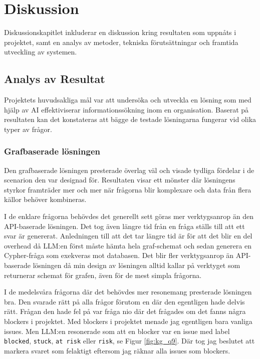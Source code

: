 \section{Diskussion}\label{sec:discussion}

Diskussionskapitlet inkluderar en diskussion kring resultaten som uppnåts i projektet, samt en analys av metoder, tekniska förutsättningar och framtida utveckling av systemen.

\subsection{Analys av Resultat}\label{subsec:discussion_analysis}

Projektets huvudsakliga mål var att undersöka och utveckla en lösning som med hjälp av AI effektiviserar informationssökning inom en organisation.
Baserat på resultaten kan det konstateras att bägge de testade lösningarna fungerar vid olika typer av frågor.

\subsubsection{Grafbaserade lösningen}

Den grafbaserade lösningen presterade överlag väl och visade tydliga fördelar i de scenarion den var designad för.
Resultaten visar ett mönster där lösningens styrkor framträder mer och mer när frågorna blir komplexare och data från flera källor behöver kombineras.

I de enklare frågorna behövdes det generellt sett göras mer verktygsanrop än den API-baserade lösningen. Det tog även längre tid från en fråga ställs till att ett svar är genererat.
Anledningen till att det tar längre tid är för att det blir en del overhead då LLM:en först måste hämta hela graf-schemat och sedan generera en Cypher-fråga som exekveras mot databasen.
Det blir fler verktygsanrop än API-baserade lösningen då min design av lösningen alltid kallar på verktyget som returnerar schemat för grafen, även för de mest simpla frågorna.

I de medelsvåra frågorna där det behövdes mer resonemang presterade lösningen bra. Den svarade rätt på alla frågor förutom en där den egentligen hade delvis rätt.
Frågan den hade fel på var fråga nio där det frågades om det fanns några blockers i projektet. Med blockers i projektet menade jag egentligen bara vanliga issues.
Men LLM:en resonerade som att en blocker var en issue med label \texttt{blocked}, \texttt{stuck}, \texttt{at risk} eller \texttt{risk}, se Figur \ref{fig:kg_q9}.
Där tog jag beslutet att markera svaret som felaktigt eftersom jag räknar alla issues som blockers.

